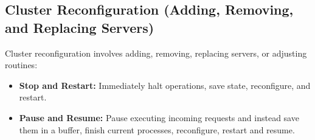 \newpage
\subsection{Cluster Reconfiguration (Adding, Removing, and Replacing Servers)}
\noindent
Cluster reconfiguration involves adding, removing, replacing servers, or adjusting routines:

\begin{Def}

    \begin{itemize}
        \item \textbf{Stop and Restart:} Immediately halt operations, save state, reconfigure, and restart.
        \item \textbf{Pause and Resume:} Pause executing incoming requests and instead save them in a buffer, finish current processes,
        reconfigure, restart and resume. 
    \end{itemize}
\end{Def}

